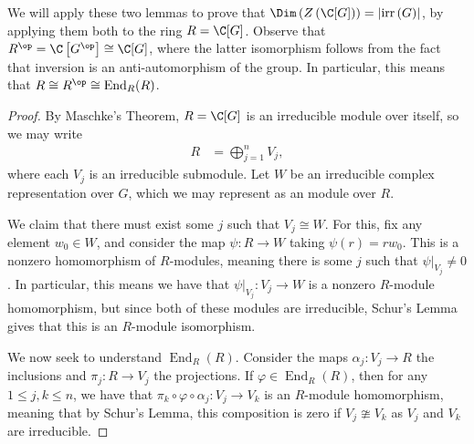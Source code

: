 \documentclass[10pt]{mypackage}
\begin{document}
We will apply these two lemmas to prove that $\Dim\left( Z\left( \C[G] \right) \right) = \left\vert \operatorname{irr}\left( G \right) \right\vert$, by applying them both to the ring $R = \C[G]$. Observe that $R^{\op} = \C\left[ G^{\op} \right] \cong \C[G]$, where the latter isomorphism follows from the fact that inversion is an anti-automorphism of the group. In particular, this means that $R\cong R^{\op}\cong \operatorname{End}_R(R)$.
\begin{proof}
  By Maschke's Theorem, $R = \C[G]$ is an irreducible module over itself, so we may write
  \begin{align*}
    R &= \bigoplus_{j=1}^{n} V_j,
  \end{align*}
  where each $V_j$ is an irreducible submodule. Let $W$ be an irreducible complex representation over $G$, which we may represent as an module over $R$.

  We claim that there must exist some $j$ such that $V_j\cong W$. For this, fix any element $w_0\in W$, and consider the map $\psi\colon R\rightarrow W$ taking $\psi(r) = rw_0$. This is a nonzero homomorphism of $R$-modules, meaning there is some $j$ such that $\psi|_{V_j}\neq 0$. In particular, this means we have that $\psi|_{V_j}\colon V_j\rightarrow W$ is a nonzero $R$-module homomorphism, but since both of these modules are irreducible, Schur's Lemma gives that this is an $R$-module isomorphism.

  We now seek to understand $\operatorname{End}_R(R)$. Consider the maps $\alpha_j\colon V_j\rightarrow R$ the inclusions and $\pi_j\colon R\rightarrow V_j$ the projections. If $\varphi\in \operatorname{End}_R(R)$, then for any $1\leq j,k\leq n$, we have that $\pi_k\circ\varphi\circ\alpha_j\colon V_j\rightarrow V_k$ is an $R$-module homomorphism, meaning that by Schur's Lemma, this composition is zero if $V_j\ncong V_k$ as $V_j$ and $V_k$ are irreducible.


\end{proof}
\end{document}

